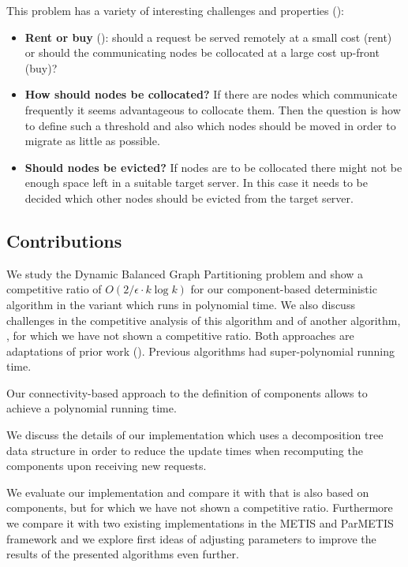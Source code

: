 \documentclass[a4paper, 10pt]{article}
\newcommand{\crep}{\text{C{\scriptsize REP}}}
\newcommand{\coreDel}{\text{C{\scriptsize REP}-C{\scriptsize ORE}}}
\newcommand{\adjDel}{\text{C{\scriptsize REP}-A{\scriptsize DJ}}}
\theoremstyle{definition}
\begin{document}
	This problem has a variety of interesting challenges and properties (\cite{Avin2016}):
	\begin{itemize}
		\item \textbf{Rent or buy} (\cite{Epstein2014}): should a request be served remotely at a small cost (rent) or should the communicating nodes be collocated at a large cost up-front (buy)?
		\item \textbf{How should nodes be collocated?} If there are nodes which communicate frequently it seems advantageous to collocate them. Then the question is how to define such a threshold and also which nodes should be moved in order to migrate as little as possible.
		\item \textbf{Should nodes be evicted?} If nodes are to be collocated there might not be enough space left in a suitable target server. In this case it needs to be decided which other nodes should be evicted from the target server.
	\end{itemize}
	
	
	
	\subsection{Contributions}
	
	We study the Dynamic Balanced Graph Partitioning problem and show a competitive ratio of $O(2/\epsilon\cdot k\log k)$ for our component-based deterministic algorithm \crep{} in the variant \adjDel{} which runs in polynomial time. We also discuss challenges in the competitive analysis of this algorithm and of another algorithm, \coreDel, for which we have not shown a competitive ratio. Both approaches are adaptations of prior work (\cite{Avin2015, Avin2016}). Previous algorithms had super-polynomial running time.
	
	Our connectivity-based approach to the definition of components allows to achieve a polynomial running time.
	
	We discuss the details of our implementation which uses a decomposition tree data structure in order to reduce the update times when recomputing the components upon receiving new requests.
	
	We evaluate our implementation and compare it with \coreDel{} that is also based on components, but for which we have not shown a competitive ratio. Furthermore we compare it with two existing implementations in the METIS and ParMETIS framework and we explore first ideas of adjusting parameters to improve the results of the presented algorithms even further.
	
\end{document}
